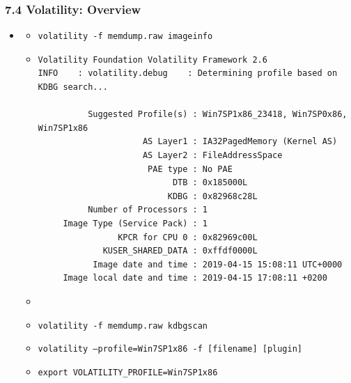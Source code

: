 \begin{frame}[fragile]
  \frametitle{7.4 Volatility: Overview}
    \begin{itemize}
        \item[]
            \begin{itemize}
                \item[] \texttt{volatility -f memdump.raw imageinfo}
                \item[]
                \begin{lstlisting}[basicstyle=\tiny]
Volatility Foundation Volatility Framework 2.6
INFO    : volatility.debug    : Determining profile based on KDBG search...

          Suggested Profile(s) : Win7SP1x86_23418, Win7SP0x86, Win7SP1x86
                     AS Layer1 : IA32PagedMemory (Kernel AS)
                     AS Layer2 : FileAddressSpace
                      PAE type : No PAE
                           DTB : 0x185000L
                          KDBG : 0x82968c28L
          Number of Processors : 1
     Image Type (Service Pack) : 1
                KPCR for CPU 0 : 0x82969c00L
             KUSER_SHARED_DATA : 0xffdf0000L
           Image date and time : 2019-04-15 15:08:11 UTC+0000
     Image local date and time : 2019-04-15 17:08:11 +0200
		\end{lstlisting}
                \item[]
                \item[] \texttt{volatility -f memdump.raw kdbgscan}
		\item[] \texttt{volatility --profile=Win7SP1x86 -f [filename] [plugin]}
		\item[] \texttt{export VOLATILITY\_PROFILE=Win7SP1x86}
            \end{itemize}
    \end{itemize}
\end{frame}


